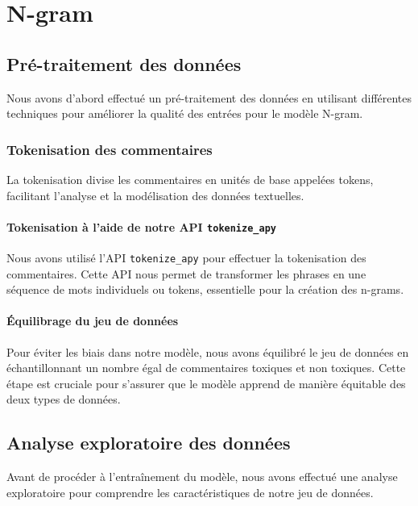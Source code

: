 \chapter{N-gram}

\section{Pré-traitement des données}

Nous avons d'abord effectué un pré-traitement des données en utilisant différentes techniques pour améliorer la qualité des entrées pour le modèle N-gram.

\subsection{Tokenisation des commentaires}

La tokenisation divise les commentaires en unités de base appelées tokens, facilitant l'analyse et la modélisation des données textuelles.

\subsubsection*{Tokenisation à l'aide de notre API \texttt{tokenize\_apy}}

Nous avons utilisé l'API \texttt{tokenize\_apy} pour effectuer la tokenisation des commentaires. Cette API nous permet de transformer les phrases en une séquence de mots individuels ou tokens, essentielle pour la création des n-grams.

\subsubsection*{Équilibrage du jeu de données}

Pour éviter les biais dans notre modèle, nous avons équilibré le jeu de données en échantillonnant un nombre égal de commentaires toxiques et non toxiques. Cette étape est cruciale pour s'assurer que le modèle apprend de manière équitable des deux types de données.

\section{Analyse exploratoire des données}

Avant de procéder à l'entraînement du modèle, nous avons effectué une analyse exploratoire pour comprendre les caractéristiques de notre jeu de données.

